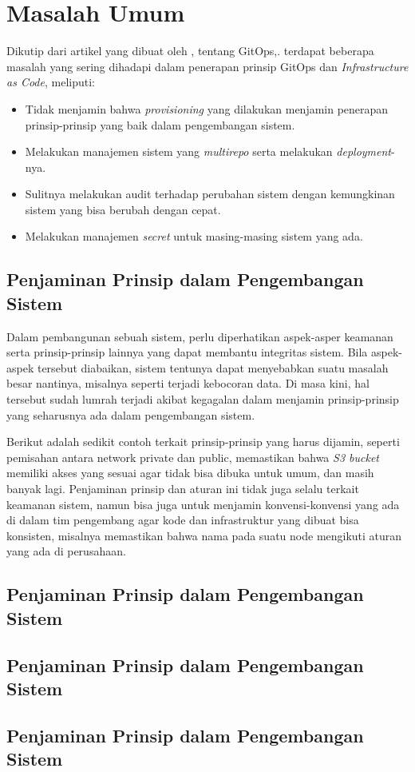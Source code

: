 \section{Masalah Umum}

Dikutip dari artikel yang dibuat oleh \cite{chrisward}, tentang GitOps,. terdapat beberapa masalah yang sering dihadapi dalam penerapan prinsip GitOps dan \textit{Infrastructure as Code}, meliputi:

\begin{itemize}
  \item Tidak menjamin bahwa \textit{provisioning} yang dilakukan menjamin penerapan prinsip-prinsip yang baik dalam pengembangan sistem.
  \item Melakukan manajemen sistem yang \textit{multirepo} serta melakukan \textit{deployment}-nya.
  \item Sulitnya melakukan audit terhadap perubahan sistem dengan kemungkinan sistem yang bisa berubah dengan cepat.
  \item Melakukan manajemen \textit{secret} untuk masing-masing sistem yang ada.
\end{itemize}

\subsection{Penjaminan Prinsip dalam Pengembangan Sistem}

Dalam pembangunan sebuah sistem, perlu diperhatikan aspek-asper keamanan serta prinsip-prinsip lainnya yang dapat membantu integritas sistem. Bila aspek-aspek tersebut diabaikan, sistem tentunya dapat menyebabkan suatu masalah besar nantinya, misalnya seperti terjadi kebocoran data. Di masa kini, hal tersebut sudah lumrah terjadi akibat kegagalan dalam menjamin prinsip-prinsip yang seharusnya ada dalam pengembangan sistem.

Berikut adalah sedikit contoh terkait prinsip-prinsip yang harus dijamin, seperti pemisahan antara network private dan public, memastikan bahwa \textit{S3 bucket} memiliki akses yang sesuai agar tidak bisa dibuka untuk umum, dan masih banyak lagi. Penjaminan prinsip dan aturan ini tidak juga selalu terkait keamanan sistem, namun bisa juga untuk menjamin konvensi-konvensi yang ada di dalam tim pengembang agar kode dan infrastruktur yang dibuat bisa konsisten, misalnya memastikan bahwa nama pada suatu node mengikuti aturan yang ada di perusahaan.

\subsection{Penjaminan Prinsip dalam Pengembangan Sistem}

\lipsum

\subsection{Penjaminan Prinsip dalam Pengembangan Sistem}

\lipsum

\subsection{Penjaminan Prinsip dalam Pengembangan Sistem}

\lipsum